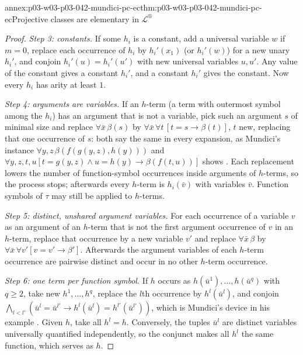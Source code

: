 \begin{annexitem}{annex:p03-w03-p03-042-mundici-pc-ec}{thm:p03-w03-p03-042-mundici-pc-ec}{Projective classes are elementary in \(\mathscr L^{\circledR}\)}
\begin{proof}
\emph{Step 3: constants.}  If some \(h_i\) is a constant, add a universal
variable \(w\) if \(m=0\), replace each occurrence of \(h_i\) by \(h_i'(x_1)\)
(or \(h_i'(w)\)) for a new unary \(h_i'\), and conjoin \(h_i'(u)=h_i'(u')\)
with new universal variables \(u,u'\).  Any value of the constant gives a
constant \(h_i'\), and a constant \(h_i'\) gives the constant.  Now every
\(h_i\) has arity at least \(1\).

\emph{Step 4: arguments are variables.}  If an \(h\)-term (a term with
outermost symbol among the \(h_i\)) has an argument that is not a variable,
pick such an argument \(s\) of minimal size and replace \(\forall\bar x\,
\beta(s)\) by \(\forall\bar x\,\forall t\,[t=s\to\beta(t)]\), \(t\) new,
replacing that one occurrence of \(s\): both say the same in every
expansion, as Mundici's instance \(\forall y,z\,\beta(f(g(y,z),h(y)))\)
and \(\forall y,z,t,u[t=g(y,z)\wedge u=h(y)\to\beta(f(t,u))]\) shows
\cite[p.~213]{Mundici1985OtherQuantifiers}.  Each replacement lowers the
number of function-symbol occurrences inside arguments of \(h\)-terms, so
the process stops; afterwards every \(h\)-term is \(h_i(\bar v)\) with
variables \(\bar v\).  Function symbols of \(\tau\) may still be applied
to \(h\)-terms.

\emph{Step 5: distinct, unshared argument variables.}  For each
occurrence of a variable \(v\) as an argument of an \(h\)-term that is not
the first argument occurrence of \(v\) in an \(h\)-term, replace that
occurrence by a new variable \(v'\) and replace \(\forall\bar x\,\beta\) by
\(\forall\bar x\,\forall v'[v=v'\to\beta']\).  Afterwards the argument
variables of each \(h\)-term occurrence are pairwise distinct and occur in
no other \(h\)-term occurrence.

\emph{Step 6: one term per function symbol.}  If \(h\) occurs as
\(h(\bar u^1),\ldots,h(\bar u^q)\) with \(q\geq2\), take new
\(h^1,\ldots,h^q\), replace the \(l\)th occurrence by \(h^l(\bar u^l)\), and
conjoin \(\bigwedge_{l<l'}(\bar u^l=\bar u^{l'}\to h^l(\bar u^l)=
h^{l'}(\bar u^{l'}))\), which is Mundici's device in his example
\cite[p.~213]{Mundici1985OtherQuantifiers}.  Given \(h\), take all \(h^l=
h\).  Conversely, the tuples \(\bar u^l\) are distinct variables
universally quantified independently, so the conjunct makes all \(h^l\)
the same function, which serves as \(h\).


\end{proof}
\end{annexitem}

